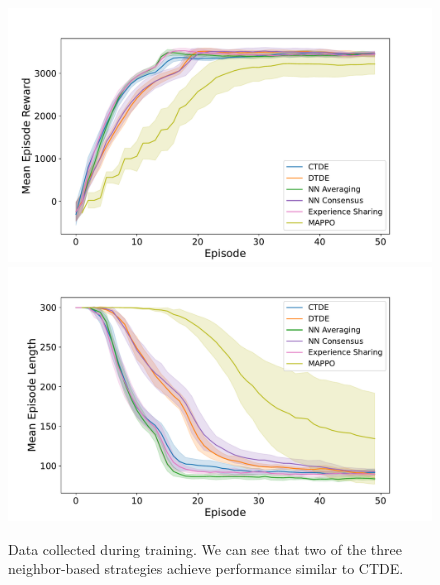 \documentclass[sigconf]{acmart}
\begin{document}
\begin{figure}
  \centering
  \includegraphics[width=1\linewidth]{figures/episode_reward_mean.pdf}
  \includegraphics[width=1\linewidth]{figures/episode_len_mean.pdf}
  \caption{Data collected during training. 
  We can see that two of the three neighbor-based strategies achieve performance similar to CTDE.
  }
  \label{fig:results}
\end{figure}
\end{document}
